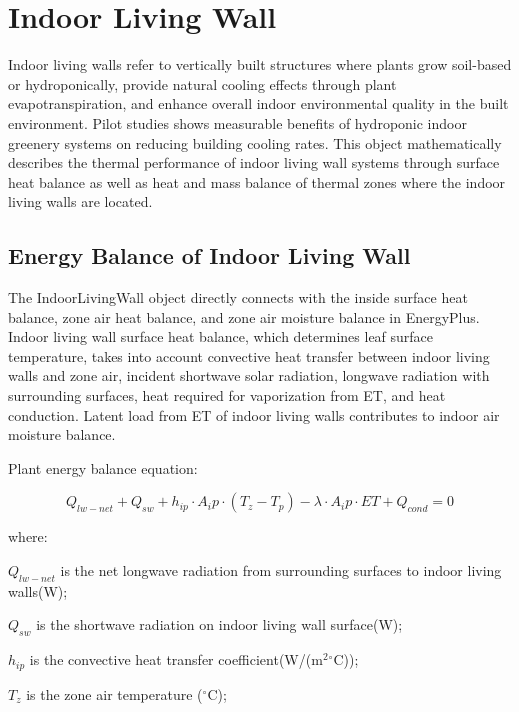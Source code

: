 \section{Indoor Living Wall }\label{indoor-living-wall}

Indoor living walls refer to vertically built structures where plants grow soil-based or hydroponically, provide natural cooling effects through plant evapotranspiration, and enhance overall indoor environmental quality in the built environment. Pilot studies shows measurable benefits of hydroponic indoor greenery systems on reducing building cooling rates. This object mathematically describes the thermal performance of indoor living wall systems through surface heat balance as well as heat and mass balance of thermal zones where the indoor living walls are located. 

\subsection{Energy Balance of Indoor Living Wall}\label{energy-balance-of-indoor-living-wall}

The IndoorLivingWall object directly connects with the inside surface heat balance, zone air heat balance, and zone air moisture balance in EnergyPlus. Indoor living wall surface heat balance, which determines leaf surface temperature, takes into account convective heat transfer between indoor living walls and zone air, incident shortwave solar radiation, longwave radiation with surrounding surfaces, heat required for vaporization from ET, and heat conduction. Latent load from ET of indoor living walls contributes to indoor air moisture balance. 

Plant energy balance equation:

\begin{equation}
Q_{lw-net}+Q_{sw}+h_{ip} \cdot A_ip \cdot (T_z - T_p )-\lambda \cdot A_ip \cdot ET+Q_{cond}=0          
\end{equation}

where:

\(Q_{lw-net}\) is the net longwave radiation from surrounding surfaces to indoor living walls(W);

\(Q_{sw}\) is the shortwave radiation on indoor living wall surface(W);

\(h_{ip}\) is the convective heat transfer coefficient(W/(m\(^2\)\(^{\circ}\)C));

\(T_z\) is the zone air temperature (\(^{\circ}\)C);

